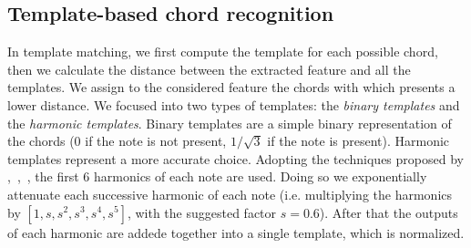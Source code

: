 \subsection{Template-based chord recognition}
\label{subsec:templates}

In template matching, we first compute the template for each possible chord, then we calculate the distance between the extracted feature and all the templates. We assign to the considered feature the chords with which presents a lower distance. We focused into two types of templates: the \textit{binary templates} and the \textit{harmonic templates}. Binary templates are a simple binary representation of the chords (0 if the note is not present, $1/\sqrt{3}$ if the note is present). Harmonic templates represent a more accurate choice. Adopting the techniques proposed by \cite{gomez2006tonal},~\cite{oudre2011chord},~\cite{Jiang2011}, the first 6 harmonics of each note are used. Doing so we exponentially attenuate each successive harmonic of each note (i.e. multiplying the harmonics by $[1, s, s^2, s^3, s^4, s^5]$, with the suggested factor $s=0.6$). After that the outputs of each harmonic are addede together into a single template, which is normalized.
